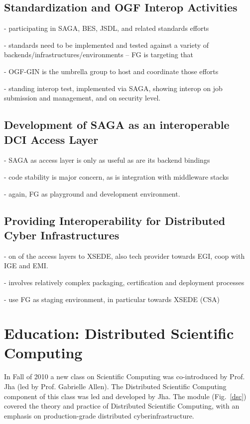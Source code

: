 \documentclass[]{paper}
\begin{document}
\subsection*{Standardization and OGF Interop Activities}
\label{ssec:std_gin}

 - participating in SAGA, BES, JSDL, and related standards efforts

 - standards need to be implemented and tested against a variety of
 backends/infrastructures/environments -- FG is targeting that

 - OGF-GIN is the umbrella group to host and coordinate those efforts

 - standing interop test, implemented via SAGA, showing interop on job
 submission and management, and on security level.



\subsection*{Development of SAGA as an interoperable DCI Access Layer}
\label{ssec:std_saga}

 - SAGA as access layer is only as useful as are its backend bindings

 - code stability is major concern, as is integration with middleware
 stacks

 - again, FG as playground and development environment.



\subsection*{Providing Interoperability for Distributed Cyber Infrastructures}
\label{ssec:std_xsede}

 - on of the access layers to XSEDE, also tech provider towards EGI,
 coop with IGE and EMI.

 - involves relatively complex packaging, certification and deployment processes

 - use FG as staging environment, in particular towards XSEDE (CSA)


\section{Education: Distributed Scientific Computing}

In Fall of 2010 a new class on Scientific Computing was co-introduced
by Prof. Jha (led by Prof. Gabrielle Allen). The Distributed
Scientific Computing component of this class was led and developed by
Jha.  The module (Fig.~\ref{dsc}) covered the theory and practice of
Distributed Scientific Computing, with an emphasis on production-grade
distributed cyberinfrastructure.
\end{document}
